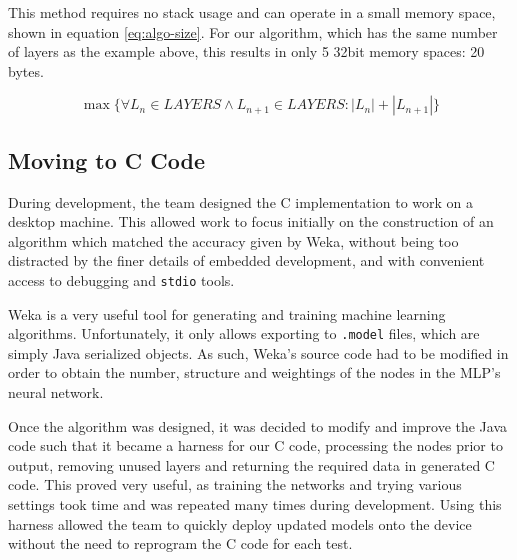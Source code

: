 \clearpage

This method requires no stack usage and can operate in a small memory space, shown in equation \ref{eq:algo-size}. For our algorithm, which has the same number of layers as the example above, this results in only 5 32bit memory spaces: 20 bytes.

\begin{equation}
\label{eq:algo-size}
\max\{\forall L_n \in LAYERS \wedge L_{n+1} \in LAYERS : |L_n|+|L_{n+1}|\}
\end{equation}

\subsection{Moving to C Code}

During development, the team designed the C implementation to work on a desktop machine. This allowed work to focus initially on the construction of an algorithm which matched the accuracy given by Weka, without being too distracted by the finer details of embedded development, and with convenient access to debugging and \verb|stdio| tools. 

Weka is a very useful tool for generating and training machine learning algorithms. Unfortunately, it only allows exporting to \verb|.model| files, which are simply Java serialized objects. As such, Weka's source code had to be modified in order to obtain the number, structure and weightings of the nodes in the MLP's neural network.

Once the algorithm was designed, it was decided to modify and improve the Java code such that it became a harness for our C code, processing the nodes prior to output, removing unused layers and returning the required data in generated C code. This proved very useful, as training the networks and trying various settings took time and was repeated many times during development. Using this harness allowed the team to quickly deploy updated models onto the device without the need to reprogram the C code for each test.